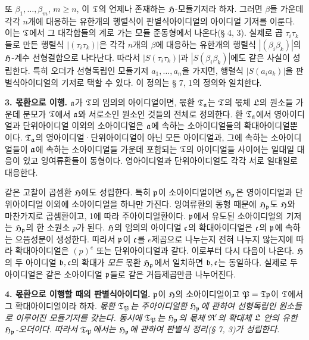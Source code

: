 또 \(\beta_1,\ldots,\beta_m\), \(m\ge n\), 이 \(\mathfrak{T}\)의 언제나 존재하는 \(\mathfrak H\)-모듈기저라 하자. 그러면 \(\beta\)들 가운데 각각 \(n\)개에 대응하는 유한개의 행렬식이 판별식아이디얼의 아이디얼 기저를 이룬다. 이는 \(\mathfrak{T}\)에서 그 대각합들의 계로 가는 모듈 준동형에서 나온다(§ 4, 3). 실제로 곱 \(\tau_i\tau_k\)들로 만든 행렬식 \(|(\tau_i\tau_k)|\)은 각각 \(n\)개의 \(\beta\)에 대응하는 유한개의 행렬식 \(|(\beta_i\beta_k)|\)의 \(\mathfrak H\)-계수 선형결합으로 나타난다. 따라서 \(|S(\tau_i\tau_k)|\)과 \(|S(\beta_i\beta_k)|\)에도 같은 사실이 성립한다. 특히 오더가 선형독립인 모듈기저 \(a_1,\ldots,a_n\)을 가지면, 행렬식 \(|S(a_i a_k)|\)을 판별식아이디얼의 기저로 택할 수 있다. 이 정의는 § 7, 1의 정의와 일치한다.

\textbf{3. 몫환으로 이행.} \(\mathfrak{a}\)가 \(\mathfrak{T}\)의 임의의 아이디얼이면, 몫환 \(\mathfrak{T}_{\mathfrak{a}}\)는 \(\mathfrak{T}\)의 몫체 \(\mathfrak L\)의 원소들 가운데 분모가 \(\mathfrak{T}\)에서 \(\mathfrak{a}\)와 서로소인 원소인 것들의 전체로 정의한다. 환 \(\mathfrak{T}_{\mathfrak{a}}\)에서 영아이디얼과 단위아이디얼 이외의 소아이디얼은 \(\mathfrak{a}\)에 속하는 소아이디얼들의 확대아이디얼뿐이다. \(\mathfrak{T}_{\mathfrak{a}}\)의 영아이디얼·단위아이디얼이 아닌 모든 아이디얼과, 그에 속하는 소아이디얼들이 \(\mathfrak{a}\)에 속하는 소아이디얼들 가운데 포함되는 \(\mathfrak{T}\)의 아이디얼들 사이에는 일대일 대응이 있고 잉여류환들이 동형이다. 영아이디얼과 단위아이디얼도 각각 서로 일대일로 대응한다.

같은 고찰이 곱셈환 \(\mathfrak H\)에도 성립한다. 특히 \(\mathfrak p\)이 소아이디얼이면 \(\mathfrak H_\mathfrak p\)은 영아이디얼과 단위아이디얼 이외에 소아이디얼을 하나만 가진다. 잉여류환의 동형 때문에 \(\mathfrak H_\mathfrak p\)도 \(\mathfrak H\)와 마찬가지로 곱셈환이고, 1에 따라 주아이디얼환이다. \(\mathfrak p\)에서 유도된 소아이디얼의 기저는 \(\mathfrak H_\mathfrak p\)의 한 소원소 \(p\)가 된다. \(\mathfrak H\)의 임의의 아이디얼 \(\mathfrak c\)의 확대아이디얼은 \(\mathfrak c\)의 \(\mathfrak p\)에 속하는 으뜸성분이 생성한다. 따라서 \(\mathfrak p\)이 \(\mathfrak c\)를 \(e\)제곱으로 나누는지 전혀 나누지 않는지에 따라 확대아이디얼은 \((p)^e\) 또는 단위아이디얼과 같다. 이로부터 다시 다음이 나온다. \(\mathfrak H\)의 두 아이디얼 \(\mathfrak{b},\mathfrak c\)의 확대가 \emph{모든} 몫환 \(\mathfrak H_\mathfrak p\)에서 일치하면 \(\mathfrak{b},\mathfrak c\)는 동일하다. 실제로 두 아이디얼은 같은 소아이디얼 \(\mathfrak p\)들로 같은 거듭제곱만큼 나누어진다.

\textbf{4. 몫환으로 이행할 때의 판별식아이디얼.} \(\mathfrak p\)이 \(\mathfrak H\)의 소아이디얼이고 \(\mathfrak P=\mathfrak{T}\mathfrak p\)이 \(\mathfrak{T}\)에서 그 확대아이디얼이라 하자. \emph{몫환 \(\mathfrak{T}_\mathfrak P\)는 주아이디얼환 \(\mathfrak H_\mathfrak p\)에 관하여 선형독립인 원소들로 이루어진 모듈기저를 갖는다. 동시에 \(\mathfrak{T}_\mathfrak P\)는 \(\mathfrak H_\mathfrak p\)의 몫체 \(\mathfrak R'\)의 확대체 \(\mathfrak L\) 안의 유한 \(\mathfrak H_\mathfrak p\)-오더이다.} \emph{따라서 \(\mathfrak{T}_\mathfrak P\)에서는 \(\mathfrak H_\mathfrak p\)에 관하여 판별식 정리(§ 7, 3)가 성립한다.}

